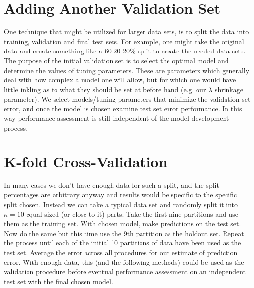\documentclass[english,nohyper,titlepage]{tufte-handout}
\begin{document}
\section{Adding Another Validation Set}
One technique that might be utilized for larger data sets, is to split the data into training, validation and final test sets.  For example, one might take the original data and create something like a 60-20-20\% split to create the needed data sets.  The purpose of the initial validation set is to select the optimal model and determine the values of tuning parameters.  These are parameters which generally deal with how complex a model one will allow, but for which one would have little inkling as to what they should be set at before hand (e.g. our $\lambda$ shrinkage parameter).  We select models/tuning parameters that minimize the validation set error, and once the model is chosen examine test set error performance.  In this way performance assessment is still independent of the model development process.

\section{K-fold Cross-Validation}
In many cases we don't have enough data for such a split, and the split percentages are arbitrary anyway and results would be specific to the specific split chosen.  Instead we can take a typical data set and randomly split it into $\kappa=10$ equal-sized (or close to it) parts.  Take the first nine partitions and use them as the training set.  With chosen model, make predictions on the test set.  Now do the same but this time use the 9th partition as the holdout set. Repeat the process until each of the initial 10 partitions of data have been used as the test set.  Average the error across all procedures for our estimate of prediction error.  With enough data, this (and the following methods) could be used as the validation procedure before eventual performance assessment on an independent test set with the final chosen model.
\end{document}
